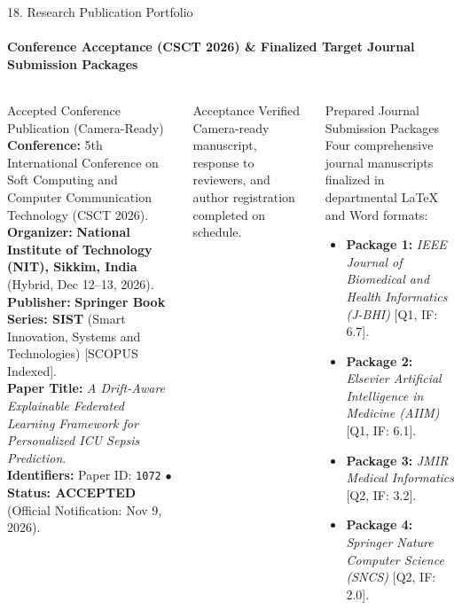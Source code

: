 \documentclass[aspectratio=169, 10pt]{beamer}
\begin{document}
\begin{frame}{18. Research Publication Portfolio}
    \framesubtitle{Conference Acceptance (CSCT 2026) \& Finalized Target Journal Submission Packages}
    \begin{columns}[T]
        \begin{block}{Accepted Conference Publication (Camera-Ready)}
            \scriptsize
            \textbf{Conference:} 5th International Conference on Soft Computing and Computer Communication Technology (CSCT 2026). \\
            \textbf{Organizer:} \textbf{National Institute of Technology (NIT), Sikkim, India} (Hybrid, Dec 12--13, 2026). \\
            \textbf{Publisher:} \textbf{Springer Book Series: SIST} (Smart Innovation, Systems and Technologies) [SCOPUS Indexed]. \\
            \textbf{Paper Title:} \textit{A Drift-Aware Explainable Federated Learning Framework for Personalized ICU Sepsis Prediction}. \\
            \textbf{Identifiers:} Paper ID: \texttt{1072} \quad$\bullet$\quad \textbf{Status: ACCEPTED} (Official Notification: Nov 9, 2026).
        \end{block}

        \begin{alertblock}{Acceptance Verified}
            \scriptsize
            Camera-ready manuscript, response to reviewers, and author registration completed on schedule.
        \end{alertblock}

        \begin{block}{Prepared Journal Submission Packages}
            \scriptsize
            Four comprehensive journal manuscripts finalized in departmental LaTeX and Word formats:
            \begin{itemize}
                \item \textbf{Package 1:} \textit{IEEE Journal of Biomedical and Health Informatics (J-BHI)} [Q1, IF: 6.7].
                \item \textbf{Package 2:} \textit{Elsevier Artificial Intelligence in Medicine (AIIM)} [Q1, IF: 6.1].
                \item \textbf{Package 3:} \textit{JMIR Medical Informatics} [Q2, IF: 3.2].
                \item \textbf{Package 4:} \textit{Springer Nature Computer Science (SNCS)} [Q2, IF: 2.0].
            \end{itemize}
        \end{block}


\end{columns}
\end{frame}
\end{document}
